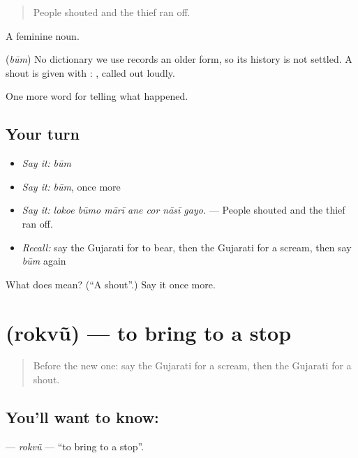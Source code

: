 \begin{quote}
People shouted and the thief ran off.
\end{quote}

A feminine noun.

\begin{cousinweb}
\textbf{} (\emph{būm}) No dictionary we use records an older form, so its history is not settled. A shout is given with \textbf{}: \textbf{ }, called out loudly.
\end{cousinweb}

\begin{grammarlens}[title={What you've built}]
One more word for telling what happened.
\end{grammarlens}

\subsection*{Your turn}
\begin{itemize}
\raggedright
  \item \emph{Say it:} \emph{būm}
  \item \emph{Say it:} \emph{būm}, once more
  \item \emph{Say it:} \emph{lokoe būmo mārī ane cor nāsī gayo.} — People shouted and the thief ran off.
  \item \emph{Recall:} say the Gujarati for to bear, then the Gujarati for a scream, then say \emph{būm} again
\end{itemize}

\begin{tcolorbox}[breakable,colback=teal!4,colframe=teal!35!black,title={Before you move on}]
What does  mean? (\textquotedblleft{}A shout\textquotedblright{}.) Say it once more.
\end{tcolorbox}
\section[\texorpdfstring{\gu{રોકવું} (rokvũ)}{રોકવું (rokvũ)}]{ (rokvũ) — to bring to a stop}

\label{lesson:GU-C299-rokvu}



\begin{quote}
Before the new one: say the Gujarati for a scream, then the Gujarati for a shout.
\end{quote}

\subsection*{You'll want to know: }
\textbf{} — \emph{rokvũ} — \textquotedblleft{}to bring to a stop\textquotedblright{}.


